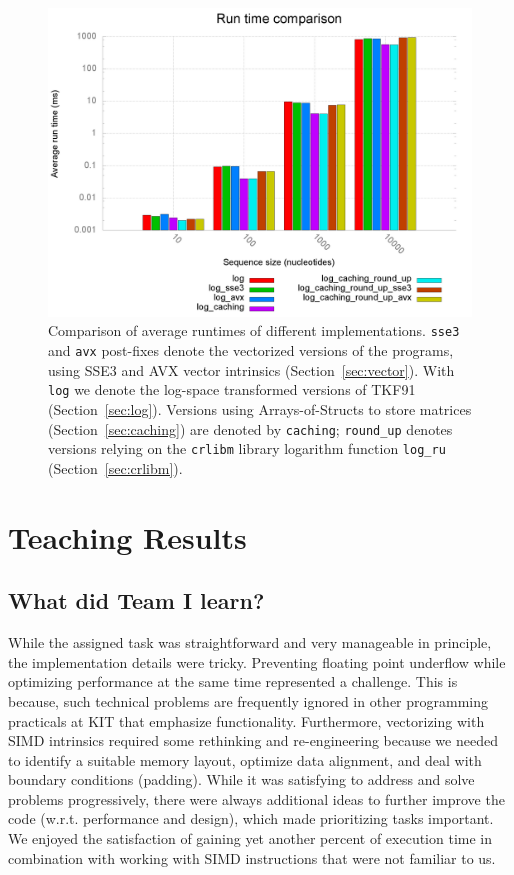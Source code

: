 \documentclass[runningheads,a4paper]{llncs}
\begin{document}
\begin{figure}[h!]
\includegraphics[width=\textwidth]{images/benchplot.png}
    \caption{Comparison of average runtimes of different implementations. \texttt{sse3} and \texttt{avx} post-fixes denote the vectorized versions of the programs, 
using SSE3 and AVX vector intrinsics (Section~\ref{sec:vector}). With \texttt{log} we denote the log-space transformed versions of TKF91 (Section~\ref{sec:log}). 
Versions using Arrays-of-Structs to store matrices (Section~\ref{sec:caching}) are denoted by \texttt{caching}; \texttt{round\_up} denotes versions relying on the \texttt{crlibm} 
library logarithm function \texttt{log\_ru} (Section~\ref{sec:crlibm}).}
\label{fig:runtime}
\end{figure}

\section{Teaching Results} 
\label{teaching-results} 
\subsection{What did Team I learn?}
While the assigned task was straightforward and very manageable in principle,
the implementation details were tricky.
Preventing floating point underflow while optimizing performance at the same time represented a challenge. 
This is because, such technical problems are frequently ignored in other programming practicals at KIT 
that emphasize functionality. 
Furthermore, vectorizing with SIMD intrinsics required some rethinking and re-engineering 
because we needed to identify a suitable memory layout, optimize data alignment, 
and deal with boundary conditions (padding). 
While it was satisfying to address and solve problems progressively, 
there were always additional ideas to further improve the code (w.r.t. performance and design), 
which made prioritizing tasks important.
We enjoyed the satisfaction of gaining yet another percent of execution time in combination 
with working with SIMD instructions that were not familiar to us.
\end{document}
